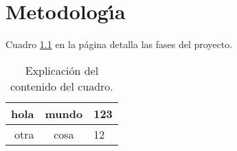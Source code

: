 \chapter{Metodolog\'{\i}a}

Cuadro \ref{fases} en la p\'{a}gina \pageref{fases} detalla las fases del proyecto.

\begin{table}
\caption{Explicaci\'{o}n del contenido del cuadro.}
\label{fases}
\begin{center}
\begin{tabular}{r|cl}
hola & mundo & 123 \\
\hline
otra & cosa & 12
\end{tabular}
\end{center}
\end{table}

